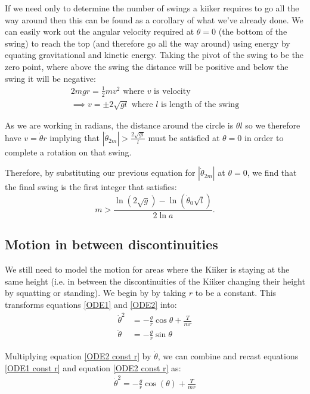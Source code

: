 \documentclass[12pt]{article}
\begin{document}
If we need only to determine the number of swings a kiiker requires to go all the way around then this can be found as a corollary of what we've already done. We can easily work out the angular velocity required at $\theta = 0$ (the bottom of the swing) to reach the top (and therefore go all the way around) using energy by equating gravitational and kinetic energy. Taking the pivot of the swing to be the zero point, where above the swing the distance will be positive and below the swing it will be negative:
\begin{align}
    2mgr = \frac{1}{2}mv^2 \,\, \text{where $v$ is velocity }\\
    \implies v = \pm 2\sqrt{gl} \,\, \text{where $l$ is length of the swing}
\end{align}

As we are working in radians, the distance around the circle is $\theta l$ so we therefore have $v = \dot{\theta}r$ implying that $|{\dot{\theta}_{2m}}| >  \frac{2\sqrt{gl}}{l}$ must be satisfied at $\theta = 0$ in order to complete a rotation on that swing.

Therefore, by substituting our previous equation for $|{\dot{\theta}_{2m}}|$ at $\theta = 0$, we find that the final swing is the first integer that satisfies:
\begin{equation}
    m >\frac{\ln\left({2 \sqrt{g}}\right) - \ln{\left(\dot{\theta}_0 \sqrt{l}\right)}}{2\ln{a}}.
\end{equation}

\subsection{Motion in between discontinuities}
We still need to model the motion for areas where the Kiiker is staying at the same height (i.e. in between the discontinuities of the Kiiker changing their height by squatting or standing). We begin by by taking $r$ to be a constant. This transforms equations \ref{ODE1} and \ref{ODE2} into:
\begin{align}
    \dot{\theta}^2 &= -\frac{g}{r} \cos{\theta} + \frac{T}{mr} \label{ODE1 const r}
    \\\ddot{\theta} &= -\frac{g}{r}\sin{\theta} \label{ODE2 const r}
\end{align}

Multiplying equation \ref{ODE2 const r} by $\dot{\theta}$, we can combine and recast equations \ref{ODE1 const r} and equation \ref{ODE2 const r} as:
\begin{align}
    \dot{\theta}^2 = -\frac{g}{r}\cos(\theta) + \frac{T}{mr}
\end{align}
\end{document}
